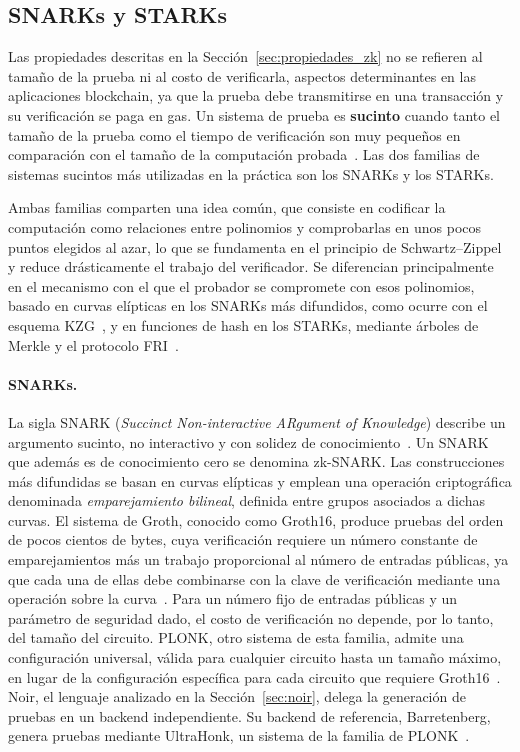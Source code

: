 \subsection{SNARKs y STARKs}
\label{sec:snarks_starks}

Las propiedades descritas en la Sección~\ref{sec:propiedades_zk} no se refieren al tamaño de
la prueba ni al costo de verificarla, aspectos determinantes en las aplicaciones blockchain, ya
que la prueba debe transmitirse en una
transacción y su verificación se paga en gas. Un sistema de prueba es \textbf{sucinto} cuando
tanto el tamaño de la prueba como el tiempo de verificación son muy pequeños en comparación con
el tamaño de la computación probada~\cite{thaler2022proofs}. Las dos familias de sistemas
sucintos más utilizadas en la práctica son los SNARKs y los STARKs.

Ambas familias comparten una idea común, que consiste en codificar la computación como
relaciones entre polinomios y comprobarlas en unos pocos puntos elegidos al azar, lo que se
fundamenta en el principio de Schwartz--Zippel~\cite{schwartz1980fast, zippel1979probabilistic}
y reduce drásticamente el trabajo del verificador. Se diferencian principalmente en el mecanismo
con el que el probador se compromete con esos polinomios, basado en curvas elípticas en los
SNARKs más difundidos, como ocurre con el esquema KZG~\cite{kate2010constant}, y en funciones de
hash en los STARKs, mediante árboles de Merkle y el protocolo FRI~\cite{bensasson2018fri}.

\paragraph{SNARKs.} La sigla SNARK (\textit{Succinct Non-interactive ARgument of Knowledge})
describe un argumento sucinto, no interactivo y con solidez de
conocimiento~\cite{bitansky2012extractable}. Un SNARK que además es de conocimiento cero se
denomina zk-SNARK. Las construcciones más difundidas se basan en curvas elípticas y emplean una operación 
criptográfica denominada \textit{emparejamiento bilineal}, definida entre grupos asociados a
dichas curvas. El sistema de Groth, conocido como Groth16, produce pruebas del orden de pocos
cientos de bytes, cuya verificación requiere un número constante de emparejamientos más un
trabajo proporcional al número de entradas públicas, ya que cada una de ellas debe combinarse con
la clave de verificación mediante una operación sobre la curva~\cite{groth2016size, snarkjs}.
Para un número fijo de entradas públicas y un parámetro de seguridad dado, el costo de
verificación no depende, por lo tanto, del tamaño del circuito.
PLONK, otro sistema de esta familia, admite una configuración universal, válida para cualquier
circuito hasta un tamaño máximo, en lugar de la configuración específica para cada circuito que
requiere Groth16~\cite{gabizon2019plonk}. Noir, el lenguaje analizado en
la Sección~\ref{sec:noir}, delega la generación de pruebas en un backend independiente. Su backend
de referencia, Barretenberg, genera pruebas mediante UltraHonk, un sistema de la familia de
PLONK~\cite{noirlang, barretenbergdocs}.

